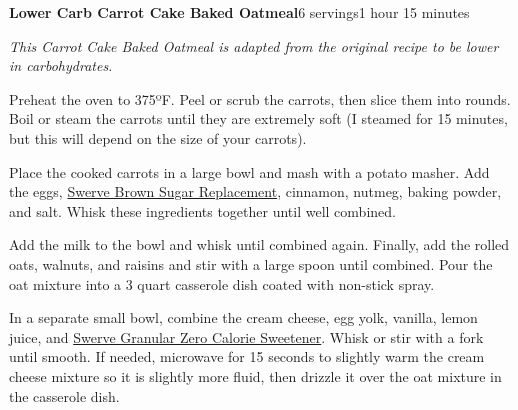 \documentclass[../recipe-collections/cooking.tex]{subfiles}
\begin{document}
\begin{recipe}{\textbf{Lower Carb Carrot Cake Baked Oatmeal}}{6 servings}{1 hour 15 minutes}

  \freeform{}\textit{This Carrot Cake Baked Oatmeal is adapted from the original
  recipe to be lower in carbohydrates.}


  Preheat the oven to 375ºF. Peel or scrub the carrots, then slice them 
  into rounds. Boil or steam the carrots until they are extremely soft 
  (I steamed for 15 minutes, but this will depend on the size of your carrots).


  Place the cooked carrots in a large bowl and mash with a potato masher. 
  Add the eggs, \href{https://www.dillons.com/p/swerve-brown-sugar-replacement/0085270030037}{Swerve Brown Sugar Replacement}, 
  cinnamon, nutmeg, baking powder, and salt. 
  Whisk these ingredients together until well combined.


  Add the milk to the bowl and whisk until combined again. Finally, add the 
  rolled oats, walnuts, and raisins and stir with a large spoon until combined. 
  Pour the oat mixture into a 3 quart casserole dish coated with non-stick spray.


  In a separate small bowl, combine the cream cheese, egg yolk, vanilla, 
  lemon juice, and \href{https://www.dillons.com/p/swerve-granular-zero-calorie-sweetener/0085270030017}{Swerve Granular Zero Calorie Sweetener}. 
  Whisk or stir with a fork until smooth. If needed, 
  microwave for 15 seconds to slightly warm the cream cheese mixture so it 
  is slightly more fluid, then drizzle it over the oat mixture in the 
  casserole dish.


\end{recipe}
\end{document}
